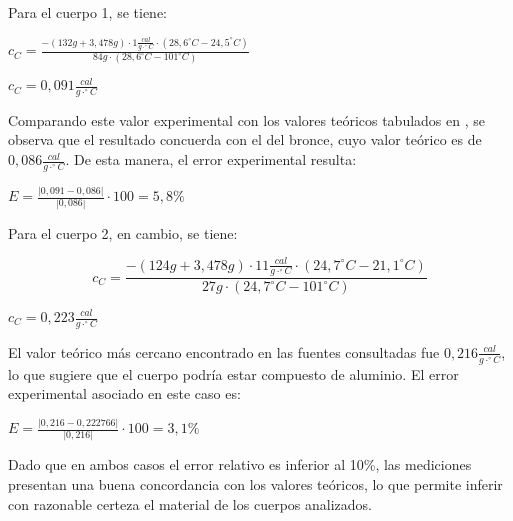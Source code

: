 \documentclass[12pt, a4paper]{article}
\begin{document}
Para el cuerpo 1, se tiene:

\begin{center}
    $ c_C = \frac{ - (132g + 3,478g) \cdot 1 \frac{cal}{g \cdot ^\circ C} \cdot (28,6^\circ C - 24,5^\circ C) }{ 84g \cdot (28,6^\circ C - 101^\circ C) } $
\end{center}
\begin{center}
    $ c_C = 0,091 \frac{cal}{g \cdot ^\circ C} $
\end{center}

Comparando este valor experimental con los valores teóricos tabulados en \cite{educamix_capacidad, fisicanet_calor}, se observa que el resultado concuerda con el del bronce, cuyo valor teórico es de $ 0,086 \frac{cal}{g \cdot ^\circ C} $. De esta manera, el error experimental resulta:

\begin{center}
    $ E =  \frac{|0,091-0,086|}{|0,086|}\cdot 100 = 5,8 \% $
\end{center}

Para el cuerpo 2, en cambio, se tiene:

\begin{equation}
    c_C = \frac{ - (124g + 3,478g) \cdot 11 \frac{cal}{g \cdot ^\circ C} \cdot (24,7^\circ C - 21,1^\circ C) }{ 27g \cdot (24,7^\circ C - 101^\circ C) }
\end{equation}
\begin{center}
    $ c_C = 0,223 \frac{cal}{g \cdot ^\circ C} $
\end{center}

El valor teórico más cercano encontrado en las fuentes consultadas \cite{educamix_capacidad,fisicanet_calor} fue $ 0,216 \frac{cal}{g \cdot ^\circ C} $, lo que sugiere que el cuerpo podría estar compuesto de aluminio. El error experimental asociado en este caso es:
\begin{center}
    $ E =  \frac{|0,216-0,222766|}{|0,216|}\cdot 100 = 3,1 \% $
\end{center}

Dado que en ambos casos el error relativo es inferior al 10\%, las mediciones presentan una buena concordancia con los valores teóricos, lo que permite inferir con razonable certeza el material de los cuerpos analizados.


\newpage
 
\end{document}
